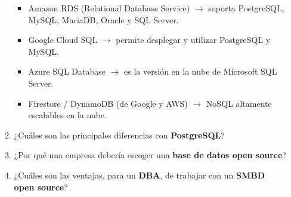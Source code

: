 \documentclass[12pt]{report}
\begin{document}
\begin{enumerate}[label=\roman*.]
\begin{enumerate}[label=\textbf{\arabic*.}, itemsep=2.0em]
\begin{itemize}
    \item Amazon RDS (Relational Database Service) $\rightarrow$ soporta PostgreSQL, MySQL, MariaDB, Oracle y SQL Server.
    \item Google Cloud SQL $\rightarrow$ permite desplegar y utilizar PostgreSQL y MySQL.
    \item Azure SQL Database $\rightarrow$ es la versión en la nube de Microsoft SQL Server.
    \item Firestore / DynamoDB (de Google y AWS) $\rightarrow$ NoSQL altamente escalables en la nube.
\end{itemize}
  \item ¿Cuáles son las principales diferencias con \textbf{PostgreSQL}?

  \item ¿Por qué una empresa debería escoger una \textbf{base de datos open source}?

  \item ¿Cuáles son las ventajas, para un \textbf{DBA}, de trabajar con un \textbf{SMBD open source}?


\end{enumerate}
\end{enumerate}
\end{document}
